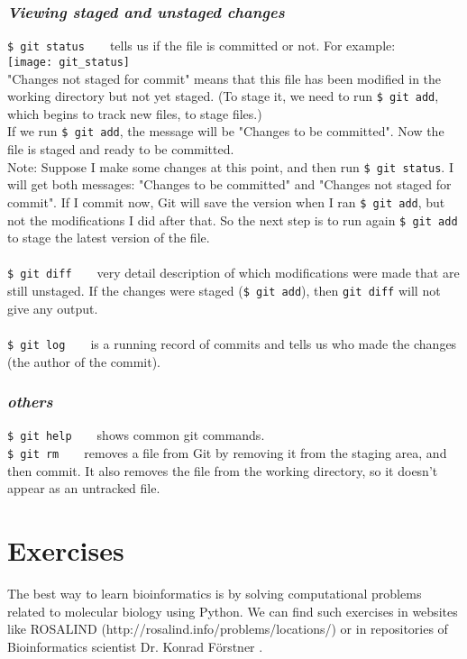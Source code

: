 \documentclass{article}
\begin{document}
{{{\subsubsection{\small\textsl{Viewing staged and unstaged changes}}
\texttt{\$ git status} ~ ~ tells us if the file is committed or not. For example:\\
\texttt{[image: git\_status]}\\
"Changes not staged for commit" means that this file has been modified in the working directory but not yet staged. (To stage it, we need to run \texttt{\$ git add}, which begins to track new files, to stage files.) \\
If we run \texttt{\$ git add}, the message will be "Changes to be committed". Now the file is staged and ready to be committed.\\ 
Note: Suppose I make some changes at this point, and then run \texttt{\$ git status}. I will get both messages: "Changes to be committed" and "Changes not staged for commit". If I commit now, Git will save the version when I ran \texttt{\$ git add}, but not the modifications I did after that. So the next step is to run again \texttt{\$ git add} to stage the latest version of the file.\\
\\
\texttt{\$ git diff} ~ ~ very detail description of which modifications were made that are still unstaged. If the changes were staged (\texttt{\$ git add}), then \texttt{git diff} will not give any output. \\
\\
\texttt{\$ git log} ~ ~ is a running record of commits and tells us who made the changes (the author of the commit).

\subsubsection{\small\textsl{others}}
\texttt{\$ git help} ~ ~ shows common git commands. \\
\texttt{\$ git rm} ~ ~ removes a file from Git by removing it from the staging area, and then commit. It also removes the file from the working directory, so it doesn't appear as an untracked file. 

\newpage
\section{Exercises}
The best way to learn bioinformatics is by solving computational problems related to molecular biology using Python. We can find such exercises in websites like ROSALIND (http://rosalind.info/problems/locations/) or in repositories of Bioinformatics scientist Dr. Konrad F\"orstner . \\

}}}
\end{document}
